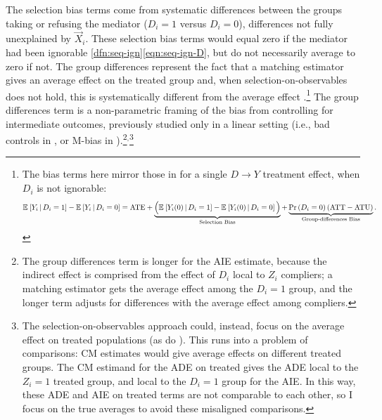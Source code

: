 The selection bias terms come from systematic differences between the groups taking or refusing the mediator ($D_i = 1$ versus $D_i = 0$), differences not fully unexplained by $\vec X_i$.
These selection bias terms would equal zero if the mediator had been ignorable \ref{dfn:seq-ign}\eqref{eqn:seq-ign-D}, but do not necessarily average to zero if not.
The group differences represent the fact that a matching estimator gives an average effect on the treated group and, when selection-on-observables does not hold, this is systematically different from the average effect \citep{heckman1998characterizing}.\footnote{
    The bias terms here mirror those in \cite{heckman1998characterizing,angrist2009mostly} for a single $D\to Y$ treatment effect, when $D_i$ is not ignorable:
    \[ \mathbb{E}_{} \left[  Y_i \, \middle\vert \, D_i =1 \right] - \mathbb{E}_{} \left[  Y_i \, \middle\vert \, D_i =0 \right]
        = \text{ATE}
        + \underbrace{\Big( \mathbb{E}_{} \left[  Y_i(0) \, \middle\vert \, D_i =1 \right] - \mathbb{E}_{} \left[  Y_i(0) \, \middle\vert \, D_i =0 \right] \Big)}_{
            \text{Selection Bias}}
        + \underbrace{ \Pr\left( D_i=0 \right) (\text{ATT}- \text{ATU}) }_{
            \text{Group-differences Bias}}. \]
}
The group differences term is a non-parametric framing of the bias from controlling for intermediate outcomes, previously studied only in a linear setting (i.e., bad controls in \citealt{cinelli2024crash}, or M-bias in \citealt{ding2015adjust}).\footnote{
    The group differences term is longer for the AIE estimate, because the indirect effect is comprised from the effect of $D_i$ local to $Z_i$ compliers; a matching estimator gets the average effect among the $D_i = 1$ group, and the longer term adjusts for differences with the average effect among compliers.
}$^{,}$\footnote{
    The selection-on-observables approach could, instead, focus on the average effect on treated populations (as do \citealt{keele2015identifying}).
    This runs into a problem of comparisons: CM estimates would give average effects on different treated groups.
    The CM estimand for the ADE on treated gives the ADE local to the $Z_i = 1$ treated group, and local to the $D_i = 1$ group for the AIE.
    In this way, these ADE and AIE on treated terms are not comparable to each other, so I focus on the true averages to avoid these misaligned comparisons.
}
